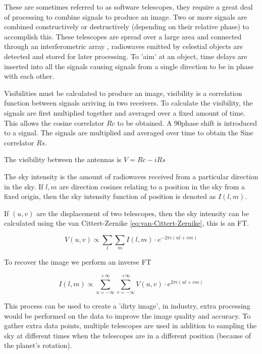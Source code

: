 These are sometimes referred to as software telescopes, they require a great deal of processing to combine signals to produce an image. Two or more signals are combined constructively or destructively (depending on their relative phase) to accomplish this. These telescopes are spread over a large area and connected through an interferometric array \textcite{Borcea_2005}, radiowaves emitted by celestial objects are detected and stored for later processing. To 'aim' at an object, time delays are inserted into all the signals causing signals from a single direction to be in phase with each other.

Visibilities must be calculated to produce an image, visibility is a correlation function between signals arriving in two receivers. To calculate the visibility, the signals are first multiplied together and averaged over a fixed amount of time. This allows the cosine correlator $Rc$ to be obtained. A 90\textdegree phase shift is introduced to a signal. The signals are multiplied and averaged over time to obtain the Sine correlator $Rs$.

The visibility between the antennas is $V =Rc - iRs$

The sky intensity is the amount of radiowaves received from a particular direction in the sky. If $l, m$ are direction cosines relating to a position in the sky from a fixed origin, then the sky intensity function of position is denoted as $I(l,m)$.

If $(u, v)$ are the displacement of two telescopes, then the sky intensity can be calculated using the van Cittert-Zernike \autoref{eq:van-Cittert-Zernike}, this is an FT.

\begin{equation}
V(u, v) \propto \sum_{l} \sum_{m} I(l, m) \cdot e^{-2\pi i(ul + vm)}
\label{eq:van-Cittert-Zernike}
\end{equation}

To recover the image we perform an inverse FT 

\begin{equation}
I(l, m) \propto \sum_{u=-\infty}^{+\infty} \sum_{v=-\infty}^{+\infty} V(u, v) \cdot e^{2\pi i(ul + vm)}
\label{eq:van-Cittert-Zernike-inverse}
\end{equation}

This process can be used to create a 'dirty image', in industry, extra processing would be performed on the data to improve the image quality and accuracy. To gather extra data points, multiple telescopes are used in addition to sampling the sky at different times when the telescopes are in a different position (because of the planet's rotation).

